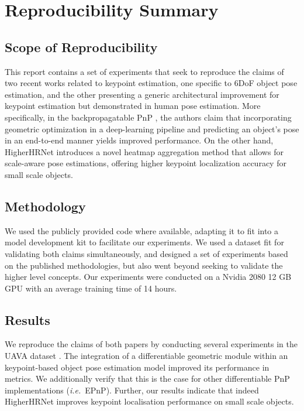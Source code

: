 

\section*{\centering Reproducibility Summary}

\subsection*{Scope of Reproducibility}

This report contains a set of experiments that seek to reproduce the claims of two recent works related to keypoint estimation, one specific to 6DoF object pose estimation, and the other presenting a generic architectural improvement for keypoint estimation but demonstrated in human pose estimation. 
More specifically, in the backpropagatable PnP \cite{chen2020end}, the authors claim that incorporating geometric optimization in a deep-learning pipeline and predicting an object’s pose in an end-to-end manner yields improved performance.
On the other hand, HigherHRNet \cite{cheng2020higherhrnet} introduces a novel heatmap aggregation method that allows for scale-aware pose estimations, offering higher keypoint localization accuracy for small scale objects.

\subsection*{Methodology}

We used the publicly provided code where available, adapting it to fit into a model development kit to facilitate our experiments.
We used a dataset fit for validating both claims simultaneously, and designed a set of experiments based on the published methodologies, but also went beyond seeking to validate the higher level concepts.
Our experiments were conducted on a Nvidia 2080 12 GB GPU with an average training time of 14 hours.

\subsection*{Results}
We reproduce the claims of both papers by conducting several experiments in the UAVA dataset \cite{albanis2020dronepose}. The integration of a differentiable geometric module within an keypoint-based object pose estimation model improved its performance in metrics. 
We additionally verify that this is the case for other differentiable PnP implementations (\textit{i.e.}~EPnP). Further, our results indicate that indeed HigherHRNet improves keypoint localisation performance on small scale objects.

